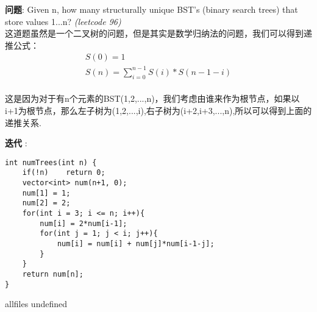 \documentclass{article}
\begin{document}
\begin{CJK}{UTF8}{gbsn}     %

\else
    
\begin{description}
    \item{\textbf{问题}}: Given n, how many structurally unique BST's (binary search trees) that store values 1...n? \textit{(leetcode 96)}
    \\这道题虽然是一个二叉树的问题，但是其实是数学归纳法的问题，我们可以得到递推公式：
    \begin{equation}
    \begin{split}
    S(0) = 1
    \\S(n) = \sum_{i = 0}^{n - 1}{S(i)*S(n-1-i)}
    \end{split}
    \end{equation}
    \\这是因为对于有n个元素的BST(1,2,...,n)，我们考虑由谁来作为根节点，如果以i+1为根节点，那么左子树为(1,2,...,i),右子树为(i+2,i+3,...,n),所以可以得到上面的递推关系.
    \item{\textbf{迭代}} : 
    \begin{lstlisting}
int numTrees(int n) {
    if(!n)    return 0;
    vector<int> num(n+1, 0);
    num[1] = 1;
    num[2] = 2;
    for(int i = 3; i <= n; i++){
        num[i] = 2*num[i-1];
        for(int j = 1; j < i; j++){
            num[i] = num[i] + num[j]*num[i-1-j];
        }
    }
    return num[n];
}
    \end{lstlisting}
    \textit{}
\end{description}

\fi

\ifx allfiles undefined
\end{CJK}
\end{document}
